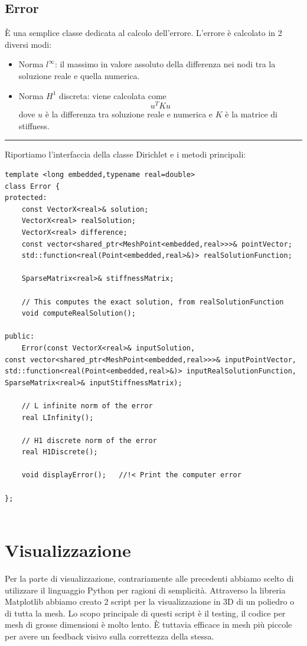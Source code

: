 \documentclass[oneside,12pt]{book}  %
\theoremstyle{plain}
\theoremstyle{definition}
\theoremstyle{remark}
\numberwithin{equation}{chapter} %
\begin{document}
\subsection{Error}
\`E una semplice classe dedicata al calcolo dell'errore. L'errore \`e
calcolato in 2 diversi modi:
\begin{itemize}
\item Norma $l^\infty$: il massimo in valore assoluto della differenza
  nei nodi tra la soluzione reale e quella numerica.

\item Norma $H^1$ discreta: viene calcolata come $$u^TKu$$ dove $u$
  \`e la differenza tra soluzione reale e numerica e $K$ \`e la matrice di stiffness.

\end{itemize}

\noindent\rule{14cm}{1pt}

Riportiamo l'interfaccia della classe Dirichlet e i metodi principali:

\begin{verbatim}
template <long embedded,typename real=double>
class Error {
protected:
    const VectorX<real>& solution;
    VectorX<real> realSolution;
    VectorX<real> difference;
    const vector<shared_ptr<MeshPoint<embedded,real>>>& pointVector;
    std::function<real(Point<embedded,real>&)> realSolutionFunction;
	
    SparseMatrix<real>& stiffnessMatrix;
	
    // This computes the exact solution, from realSolutionFunction
    void computeRealSolution(); 
	
public:
    Error(const VectorX<real>& inputSolution,
const vector<shared_ptr<MeshPoint<embedded,real>>>& inputPointVector,
std::function<real(Point<embedded,real>&)> inputRealSolutionFunction,
SparseMatrix<real>& inputStiffnessMatrix);

    // L infinite norm of the error
    real LInfinity();
	
    // H1 discrete norm of the error
    real H1Discrete();
	
    void displayError();   //!< Print the computer error
	
};


\end{verbatim}

\section{Visualizzazione }
\label{sec:visualizzazione}
Per la parte di visualizzazione, contrariamente alle precedenti
abbiamo scelto di utilizzare il linguaggio Python per ragioni di
semplicit\`a. 
Attraverso la libreria Matplotlib abbiamo creato 2 script per la
visualizzazione in 3D di un poliedro o di tutta la mesh. Lo scopo
principale di questi script \`e il testing, il codice per mesh di
grosse dimensioni \`e molto lento. \`E tuttavia efficace in mesh
pi\`u piccole per avere un feedback visivo sulla correttezza della
stessa. 
\end{document}
